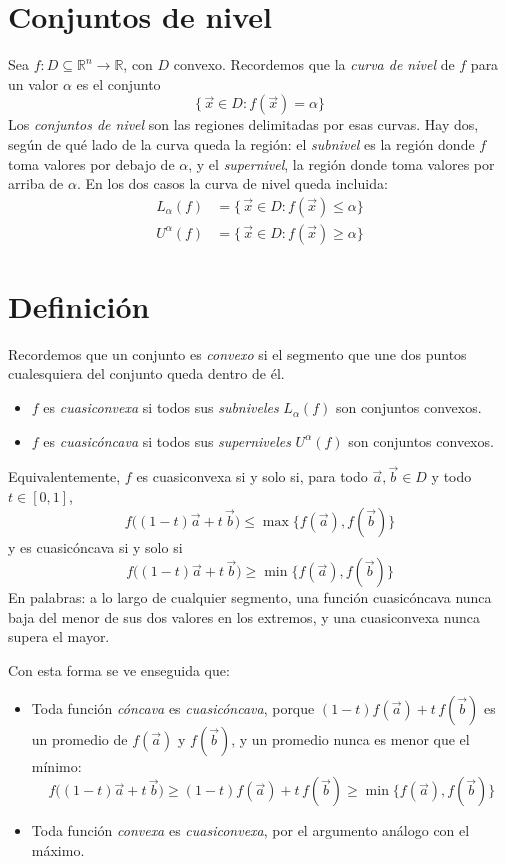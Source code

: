 \documentclass{article}
\newcommand{\R}{\ensuremath{\mathbb{R}}}
\newcommand{\vect}[1]{\vec{#1}}
\begin{document}
\section*{Conjuntos de nivel}

Sea \(f\colon D\subseteq\R^n\to\R\), con \(D\) convexo. Recordemos que la \emph{curva de nivel} de \(f\) para un valor \(\alpha\) es el conjunto
\[
\{\,\vect{x}\in D : f(\vect{x})=\alpha\}
\]
Los \emph{conjuntos de nivel} son las regiones delimitadas por esas curvas. Hay dos, según de qué lado de la curva queda la región: el \emph{subnivel} es la región donde \(f\) toma valores por debajo de \(\alpha\), y el \emph{supernivel}, la región donde toma valores por arriba de \(\alpha\). En los dos casos la curva de nivel queda incluida:
\[
\begin{aligned}
L_\alpha(f) &= \{\,\vect{x}\in D : f(\vect{x})\le \alpha\}\\[4pt]
U^\alpha(f) &= \{\,\vect{x}\in D : f(\vect{x})\ge \alpha\}
\end{aligned}
\]

\section*{Definición}

Recordemos que un conjunto es \emph{convexo} si el segmento que une dos puntos cualesquiera del conjunto queda dentro de él.
\begin{itemize}
  \item {\color{teal}\(f\) es \emph{cuasiconvexa} si todos sus \emph{subniveles} \(L_\alpha(f)\) son conjuntos convexos.}
  \item {\color{teal}\(f\) es \emph{cuasicóncava} si todos sus \emph{superniveles} \(U^\alpha(f)\) son conjuntos convexos.}
\end{itemize}

\noindent Equivalentemente, \(f\) es cuasiconvexa si y solo si, para todo \(\vect{a},\vect{b}\in D\) y todo \(t\in[0,1]\),
\[
f\bigl((1-t)\vect{a}+t\,\vect{b}\bigr)\le\max\{f(\vect{a}),f(\vect{b})\}
\]
y es cuasicóncava si y solo si
\[
f\bigl((1-t)\vect{a}+t\,\vect{b}\bigr)\ge\min\{f(\vect{a}),f(\vect{b})\}
\]
En palabras: a lo largo de cualquier segmento, una función cuasicóncava nunca baja del menor de sus dos valores en los extremos, y una cuasiconvexa nunca supera el mayor.

\noindent Con esta forma se ve enseguida que:
\begin{itemize}
  \item Toda función \emph{cóncava} es \emph{cuasicóncava}, porque \((1-t)f(\vect{a})+t\,f(\vect{b})\) es un promedio de \(f(\vect{a})\) y \(f(\vect{b})\), y un promedio nunca es menor que el mínimo:
  \[
  f\bigl((1-t)\vect{a}+t\,\vect{b}\bigr)\ge(1-t)f(\vect{a})+t\,f(\vect{b})\ge\min\{f(\vect{a}),f(\vect{b})\}
  \]
  \item Toda función \emph{convexa} es \emph{cuasiconvexa}, por el argumento análogo con el máximo.
\end{itemize}
\end{document}
